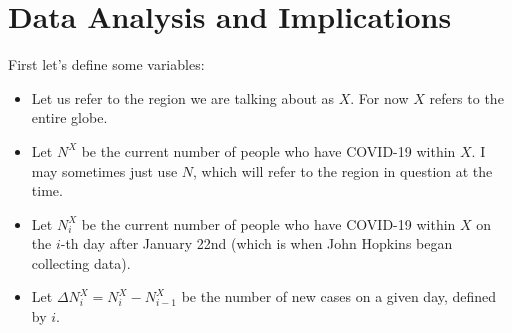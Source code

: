 \documentclass{report}
\begin{document}
    \section{Data Analysis and Implications}
        \indent First let's define some variables:
        \begin{itemize}
            \item Let us refer to the region we are talking about as $X$. For now $X$ refers to the entire globe.
            \item Let $N^X$ be the current number of people who have COVID-19 within $X$. I may sometimes just use $N$, which will refer to the region in question at the time.
            \item Let $N^X_i$ be the current number of people who have COVID-19 within $X$ on the $i$-th day after January 22nd (which is when John Hopkins began collecting data).
            \item Let $\Delta N^X_i = N^X_i - N^X_{i - 1}$ be the number of new cases on a given day, defined by $i$.
        \end{itemize}
\end{document}
